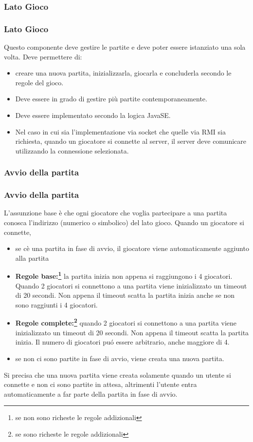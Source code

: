 \documentclass{beamer}
\begin{document}
\subsubsection{Lato Gioco}
\begin{frame}
\frametitle{Lato Gioco}
Questo componente deve gestire le partite e deve poter essere
istanziato una sola volta. Deve permettere di:
\begin{itemize}
\item creare una nuova partita, inizializzarla, giocarla e concluderla secondo le regole del gioco.
\item Deve essere in grado di gestire pi\`u partite
  contemporaneamente.
\item Deve essere implementato secondo la logica JavaSE.
\item Nel caso in cui sia l'implementazione via socket che quelle via
  RMI sia richiesta, quando un giocatore si connette al server, il server deve comunicare utilizzando la connessione selezionata.
\end{itemize}
\end{frame}

\subsubsection{Avvio della partita}
\begin{frame}
\frametitle{Avvio della partita}
L'assunzione base \`e che ogni giocatore che voglia partecipare a
una partita conosca l'indirizzo (numerico o simbolico) del lato gioco. Quando un giocatore si connette, 
\begin{itemize}
\item se c\`e una partita in fase di avvio, il giocatore viene automaticamente aggiunto alla partita
\item  \textbf{Regole base:\footnote{se non sono richeste le regole
      addizionali}} la partita inizia non appena si raggiungono i 4
  giocatori. Quando 2 giocatori si connettono a una partita viene
  inizializzato un timeout di 20 secondi. Non appena il timeout scatta
  la partita inizia anche se non sono raggiunti i 4 giocatori.
\item  \textbf{Regole complete:\footnote{se sono richeste le regole
      addizionali}} quando 2 giocatori si connettono a una partita viene
  inizializzato un timeout di 20 secondi. Non appena il timeout scatta
  la partita inizia. Il numero di giocatori pu\'o essere arbitrario,
  anche maggiore di 4.
\item se non ci sono partite in fase di avvio, viene creata una nuova partita.
\end{itemize}
Si precisa che una nuova partita viene creata solamente quando un utente si connette e non ci sono partite in attesa, altrimenti l'utente entra automaticamente a far parte della partita in fase di avvio.
\end{frame}
\end{document}
